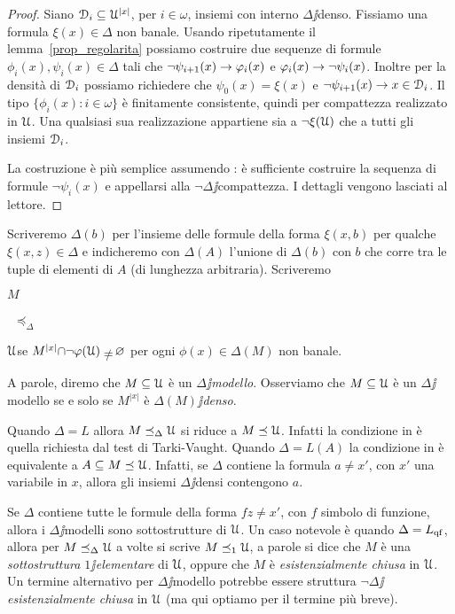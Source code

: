 \begin{proof}
Siano $\EuScript D_i\subseteq\EuScript U^{|x|}$, per $i\in\omega$, insiemi con interno $\Delta\jj$denso. Fissiamo una formula $\xi(x)\in\Delta$ non banale. Usando ripetutamente il lemma~\ref{prop_regolarita} possiamo costruire due sequenze di formule $\phi_i(x),\psi_i(x)\in\Delta$ tali che $\neg\psi_{i+1}(x)\rightarrow\varphi_i(x)$ e  $\varphi_i(x)\rightarrow\neg\psi_i(x)$. Inoltre  per la densit\`a di $\EuScript D_i$ possiamo richiedere che $\psi_0(x)=\xi(x)$ e $\neg\psi_{i+1}(x)\rightarrow x\in\EuScript D_i$. Il tipo $\{\phi_i(x) : i\in\omega\}$ \`e finitamente consistente, quindi per compattezza realizzato in $\EuScript U$. Una qualsiasi sua realizzazione appartiene sia a $\neg\xi(\EuScript U)$ che a tutti gli insiemi $\EuScript D_i$.

La costruzione \`e pi\`u semplice assumendo : \`e sufficiente costruire la sequenza di formule $\neg\psi_i(x)$ e appellarsi alla $\neg\Delta\jj$compattezza. I dettagli vengono lasciati al lettore.
\end{proof}   

Scriveremo \emph{$\Delta(b)$\/} per l'insieme delle formule della forma $\xi(x,b)$ per qualche $\xi(x,z)\in\Delta$ e indicheremo con \emph{$\Delta(A)$\/} l'unione di $\Delta(b)$ con $b$ che corre tra le tuple di elementi di $A$ (di lunghezza arbitraria). Scriveremo 

\def\ceqb#1#2#3{\parbox{8ex}{\hfill\emph{$#1$}}\parbox{5ex}{\hfil\emph{\ $#2$}}\emph{$#3$}}

\ceqb{M}{\preceq_{\Delta}}{\U}\hfill se $M^{|x|}\mathord\cap\neg\phi(\U)\;\neq\;\0$ per ogni $\phi(x)\in\Delta(M)$ non banale.

A parole, diremo che $M\subseteq\EuScript U$ \`e un \emph{$\Delta\jj$modello}. Osserviamo che $M\subseteq\EuScript U$ \`e un $\Delta\jj$modello se e solo se $M^{|x|}$ \`e \emph{$\Delta(M)\jj$denso}.

Quando $\Delta=L$ allora $M\preceq_{\Delta}\EuScript U$ si riduce a $M\preceq\EuScript U$. Infatti la condizione in  \`e quella richiesta dal test di Tarki-Vaught. Quando $\Delta=L(A)$ la condizione in  \`e equivalente a $A\subseteq M\preceq\EuScript U$. Infatti, se $\Delta$ contiene la formula $a\neq x'$, con $x'$ una variabile in $x$, allora gli insiemi $\Delta\jj$densi contengono $a$.   

Se $\Delta$ contiene tutte le formule della forma $fz\neq x'$, con $f$ simbolo di funzione, allora i $\Delta\jj$modelli sono sottostrutture di $\EuScript U$. Un caso notevole \`e quando $\Delta=L_{\rm qf}$, allora per $M\preceq_{\Delta}\EuScript U$ a volte si scrive $M\preceq_{1}\EuScript U$, a parole si dice che $M$ \`e una \emph{sottostruttura $1\jj$elementare\/} di $\EuScript U$, oppure che $M$ \`e \emph{esistenzialmente chiusa\/} in $\EuScript U$. Un termine alternativo per $\Delta\jj$modello potrebbe essere struttura  \emph{$\neg\Delta\jj$esistenzialmente chiusa\/} in $\EuScript U$ (ma qui optiamo per il termine pi\`u breve).

